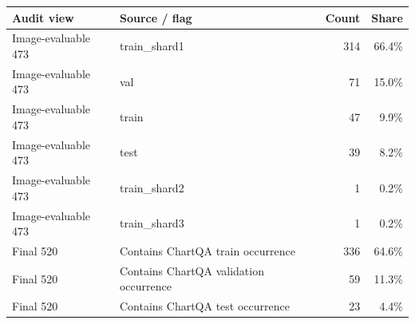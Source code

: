 \begin{tabular}{llrr}
\toprule
Audit view & Source / flag & Count & Share \\
\midrule
Image-evaluable 473 & train\_shard1 & 314 & 66.4\% \\
Image-evaluable 473 & val & 71 & 15.0\% \\
Image-evaluable 473 & train & 47 & 9.9\% \\
Image-evaluable 473 & test & 39 & 8.2\% \\
Image-evaluable 473 & train\_shard2 & 1 & 0.2\% \\
Image-evaluable 473 & train\_shard3 & 1 & 0.2\% \\
Final 520 & Contains ChartQA train occurrence & 336 & 64.6\% \\
Final 520 & Contains ChartQA validation occurrence & 59 & 11.3\% \\
Final 520 & Contains ChartQA test occurrence & 23 & 4.4\% \\
\bottomrule
\end{tabular}
